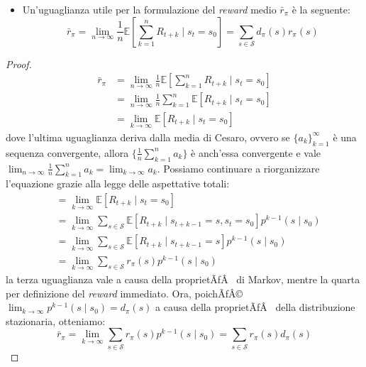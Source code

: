 ﻿\documentclass[11pt, a4paper]{report}
\begin{document}
\begin{itemize}
    \item Un'uguaglianza utile per la formulazione del \emph{reward} medio $\bar{r}_{\pi}$ è la seguente:
    \begin{equation}
    \bar{r}_{\pi} = \lim_{n \to \infty} \frac{1}{n} \mathbb{E} \left[ \sum_{k=1}^n R_{t+k} \mid s_t = s_0 \right] = \sum_{s \in \mathcal{S}} d_{\pi}(s) r_{\pi}(s)
    \end{equation}
\end{itemize}

\begin{proof}
\begin{align*}
\bar{r}_{\pi} &= \lim_{n \to \infty} \frac{1}{n} \mathbb{E} \left[ \sum_{k=1}^n R_{t+k} \mid s_t = s_0 \right] \\
&= \lim_{n \to \infty} \frac{1}{n} \sum_{k=1}^n \mathbb{E} [R_{t+k} \mid s_t = s_0] \\
&= \lim_{k \to \infty} \mathbb{E} [R_{t+k} \mid s_t = s_0]
\end{align*}
dove l'ultima uguaglianza deriva dalla media di Cesaro, ovvero se $\{a_k\}_{k=1}^{\infty}$ è una sequenza convergente, allora $\{\frac{1}{n} \sum_{k=1}^n a_k\}$ è anch'essa convergente e vale $\lim_{n \to \infty} \frac{1}{n} \sum_{k=1}^n a_k = \lim_{k \to \infty} a_k$. Possiamo continuare a riorganizzare l'equazione grazie alla legge delle aspettative totali:
\begin{align*}
&= \lim_{k \to \infty} \mathbb{E} [R_{t+k} \mid s_t = s_0] \\
&= \lim_{k \to \infty} \sum_{s \in \mathcal{S}} \mathbb{E} [R_{t+k} \mid s_{t+k-1} = s, s_t = s_0] p^{k-1}(s \mid s_0) \\
&= \lim_{k \to \infty} \sum_{s \in \mathcal{S}} \mathbb{E} [R_{t+k} \mid s_{t+k-1} = s] p^{k-1}(s \mid s_0) \\
&= \lim_{k \to \infty} \sum_{s \in \mathcal{S}} r_{\pi}(s) p^{k-1}(s \mid s_0)
\end{align*}
la terza uguaglianza vale a causa della proprietÃƒÂ  di Markov, mentre la quarta per definizione del \emph{reward} immediato. Ora, poichÃƒÂ© $\lim_{k \to \infty} p^{k-1}(s \mid s_0) = d_{\pi}(s)$ a causa della proprietÃƒÂ  della distribuzione stazionaria, otteniamo:
\begin{equation}
\bar{r}_{\pi} = \lim_{k \to \infty} \sum_{s \in \mathcal{S}} r_{\pi}(s) p^{k-1}(s \mid s_0) = \sum_{s \in \mathcal{S}} r_{\pi}(s) d_{\pi}(s)
\end{equation}
\end{proof}
\end{document}
